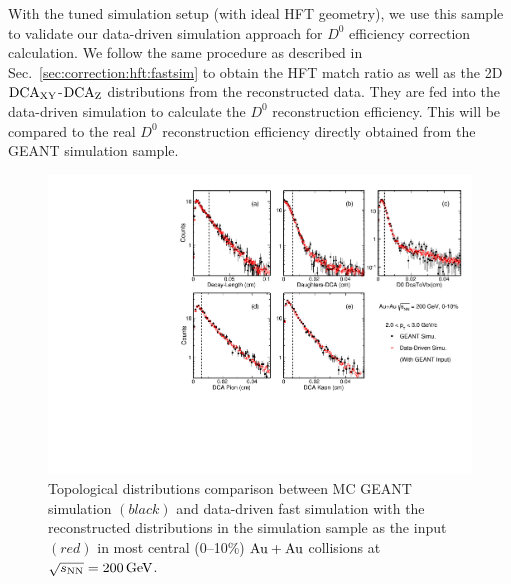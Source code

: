 \documentclass[%
 reprint,	
 amsmath,amssymb,
 aps,
 prc,
]{revtex4-1}
\begin{document}

With the tuned simulation setup (with ideal HFT geometry), we use this sample to validate our data-driven simulation approach for $D^0$ efficiency correction calculation. We follow the same procedure as described in Sec.~\ref{sec:correction:hft:fastsim} to obtain the HFT match ratio as well as the 2D $\textup{DCA}_\textup{XY}$-$\textup{DCA}_\textup{Z}$ distributions from the reconstructed data. They are fed into the data-driven simulation to calculate the $D^0$ reconstruction efficiency. This will be compared to the real $D^0$ reconstruction efficiency directly obtained from the GEANT simulation sample.

\begin{figure}
\centering
\includegraphics[width=1.0\textwidth]{fig/McTopo.pdf}
\caption{Topological distributions comparison between MC GEANT simulation $(black)$ and data-driven fast simulation with the reconstructed distributions in the simulation sample as the input $(red)$ in most central (0--10\%) ${\rm{Au + Au}}$ collisions at ${\sqrt{s_{\rm NN}} = \rm{200\,GeV}}$.}
\label{fig:McTopo} 
\end{figure}
\end{document}
